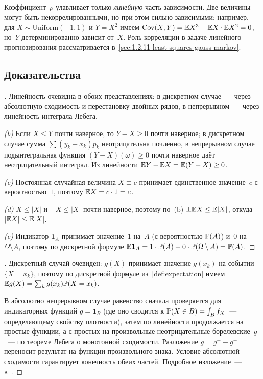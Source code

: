 \begin{remark}
Коэффициент~$\rho$ улавливает только \emph{линейную} часть зависимости. Две величины могут быть некоррелированными, но при этом сильно зависимыми: например, для $X \sim \mathrm{Uniform}(-1, 1)$ и $Y = X^2$ имеем $\operatorname{Cov}(X, Y) = \mathbb{E} X^3 - \mathbb{E} X \cdot \mathbb{E} X^2 = 0$, но~$Y$ детерминированно зависит от~$X$. Роль корреляции в задаче линейного прогнозирования рассматривается в~\cref{sec:1.2.11-least-squares-gauss-markov}.
\end{remark}

\subsection*{Доказательства}

\begin{proof}[]
Линейность очевидна в обоих представлениях: в дискретном случае~--- через абсолютную сходимость и перестановку двойных рядов, в непрерывном~--- через линейность интеграла Лебега.

\emph{(b)} Если $X \leq Y$ почти наверное, то $Y - X \geq 0$ почти наверное; в дискретном случае сумма $\sum (y_k - x_k) p_k$ неотрицательна почленно, в непрерывном случае подынтегральная функция $(Y - X)(\omega) \geq 0$ почти наверное даёт неотрицательный интеграл. Из линейности $\mathbb{E} Y - \mathbb{E} X = \mathbb{E}(Y - X) \geq 0$.

\emph{(c)} Постоянная случайная величина $X \equiv c$ принимает единственное значение~$c$ с вероятностью~$1$, поэтому $\mathbb{E} X = c \cdot 1 = c$.

\emph{(d)} $X \leq |X|$ и $-X \leq |X|$ почти наверное, поэтому по~(b) $\pm \mathbb{E} X \leq \mathbb{E} |X|$, откуда $|\mathbb{E} X| \leq \mathbb{E} |X|$.

\emph{(e)} Индикатор $\mathbf{1}_A$ принимает значение~$1$ на~$A$ (с вероятностью $\mathbb{P}(A)$) и~$0$ на $\Omega \setminus A$, поэтому по дискретной формуле $\mathbb{E} \mathbf{1}_A = 1 \cdot \mathbb{P}(A) + 0 \cdot \mathbb{P}(\Omega \setminus A) = \mathbb{P}(A)$.
\end{proof}

\begin{proof}[]
Дискретный случай очевиден: $g(X)$ принимает значение $g(x_k)$ на событии $\{X = x_k\}$, поэтому по дискретной формуле из~\cref{def:expectation} имеем $\mathbb{E} g(X) = \sum_k g(x_k) \mathbb{P}(X = x_k)$.

В абсолютно непрерывном случае равенство сначала проверяется для индикаторных функций $g = \mathbf{1}_B$ (где оно сводится к $\mathbb{P}(X \in B) = \int_B f_X$~--- определяющему свойству плотности), затем по линейности продолжается на простые функции, а с простых на произвольные неотрицательные борелевские~$g$~--- по теореме Лебега о монотонной сходимости. Разложение $g = g^+ - g^-$ переносит результат на функции произвольного знака. Условие абсолютной сходимости гарантирует конечность обеих частей. Подробное изложение~--- в~\cite[гл.~II, \S~6]{Shiryaev1989}.
\end{proof}

